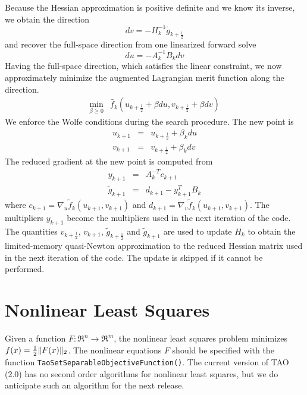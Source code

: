 Because the Hessian approximation is positive definite and we know its
inverse, we obtain the direction
\[
  dv = -H_k^{-1} \tilde{g}_{k+\frac{1}{2}}
\]
and recover the full-space direction from one linearized forward solve
\[
  du = -A_k^{-1} B_k dv
\]
Having the full-space direction, which satisfies the linear constraint, 
we now approximately minimize the augmented Lagrangian merit function 
along the direction.
\[
\begin{array}{lcl}
\displaystyle \min_{\beta \geq 0} & \tilde{f_k}(u_{k+\frac{1}{2}} + \beta du, v_{k+\frac{1}{2}} + \beta dv)
\end{array}
\]
We enforce the Wolfe conditions during the search procedure.  The new point
is
\[
\begin{array}{lcl}
u_{k+1} & = & u_{k+\frac{1}{2}} + \beta_k du \\
v_{k+1} & = & v_{k+\frac{1}{2}} + \beta_k dv
\end{array}
\]
The reduced gradient at the new point is computed from
\[
\begin{array}{lcl}
y_{k+1} & = & A_k^{-T}c_{k+1} \\
\tilde{g}_{k+1} & = & d_{k+1} - y_{k+1}^T B_k
\end{array}
\]
where $c_{k+1} = \nabla_u \tilde{f}_k (u_{k+1},v_{k+1})$ and
$d_{k+1} = \nabla_v \tilde{f}_k (u_{k+1},v_{k+1})$.  The
multipliers $y_{k+1}$ become the multipliers used in the
next iteration of the code.  The quantities $v_{k+\frac{1}{2}}$,
$v_{k+1}$, $\tilde{g}_{k+\frac{1}{2}}$ and $\tilde{g}_{k+1}$ are
used to update $H_k$ to obtain the limited-memory quasi-Newton
approximation to the reduced Hessian matrix used in the next
iteration of the code.  The update is skipped if it cannot be
performed.

\section{Nonlinear Least Squares}
\label{sec:leastsquares}
Given a function $F  : \Re^n \to \Re^m$, the nonlinear least
squares problem minimizes $f(x)={\textstyle{\frac{1}{2}}} \| F(x) \|_2$.
The nonlinear equations $F$ should be specified with the function
{\tt Tao\-Set\-Separ\-able\-Objective\-Function()}.
The current version of TAO (2.0) has no second order algorithms 
for nonlinear least squares, but we do anticipate such an algorithm for the
next release.

\begin{comment}
Most solvers also require the Jacobian of this function.  
The routine that evaluates this matrix should be set
using the command {\tt Tao\-Set\-Jacobian\-Routine()}.

Using the constraint data provided by the user, the nonlinear
least squares solver formulates a minimization problem, and
solves the minimization problem using another TAO solver.  
A nonlinear least squares application should be solved with
the method \texttt{tao\_pounders} or \texttt{tao\_lm}.
\textbf{***** Jason, check the lm above. It would be great to include it
but otherwise say that we only have methods that do not use the Jacobian
and that if they have a Jacobian, they should use something else/the
next/beta version.}
\end{comment}


